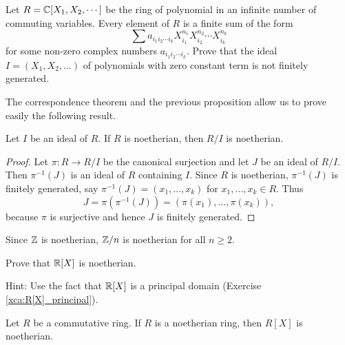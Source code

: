 \begin{exercise}
	Let $R=\mathbb{C}[X_1,X_2,\cdots]$ be the ring of polynomial in an infinite number of 
	commuting variables. 
	Every element of $R$ is a finite sum
	of the form 
	\[
	\sum a_{i_1i_2\cdots i_k}X_{i_1}^{n_1}X_{i_2}^{n_2}\cdots X_{i_k}^{n_k}
	\]
	for some non-zero complex numbers 
	$a_{i_1i_2\cdots i_k}$. 
	Prove that the ideal $I=(X_1,X_2,\dots)$ of polynomials 
	with zero constant term is not finitely generated. 
\end{exercise}

The correspondence theorem and the previous proposition 
allow us to prove easily the following result. 

\begin{proposition}
	Let $I$ be an ideal of $R$. If $R$ is noetherian, then $R/I$ is noetherian.
\end{proposition}

\begin{proof}
	Let $\pi\colon R\to R/I$ be the canonical surjection and let $J$ be an ideal of $R/I$. 
	Then $\pi^{-1}(J)$ is an ideal of $R$ containing $I$. Since 
	$R$ is noetherian, $\pi^{-1}(J)$ is finitely generated, say 
	$\pi^{-1}(J)=(x_1,\dots,x_k)$ for $x_1,\dots,x_k\in R$. Thus 
	\[
	J=\pi(\pi^{-1}(J))=(\pi(x_1),\dots,\pi(x_k)),
	\]
	because $\pi$ is surjective 
	and hence $J$ is finitely generated. 
\end{proof}

Since $\mathbb{Z}$ is noetherian, $\mathbb{Z}/n$ is noetherian for all $n\geq2$. 

\begin{exercise}
\label{xca:R[X]_noetherian}
	Prove that $\mathbb{R}[X]$ is noetherian. 	
\end{exercise}

Hint: Use the fact that $\mathbb{R}[X]$ is a principal domain (Exercise \ref{xca:R[X]_principal}).  

\begin{theorem}[Hilbert]
	Let $R$ be a commutative ring. If $R$ is a noetherian ring, then $R[X]$ is noetherian.	
\end{theorem}

